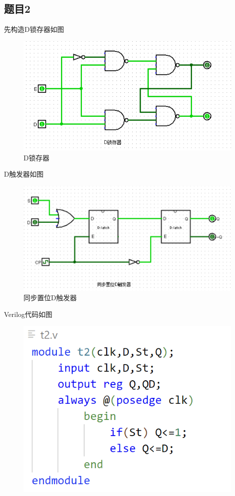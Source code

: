 \documentclass{article}
\begin{document}
    \clearpage
    \subsection*{题目2} 先构造D锁存器如图
    \begin{figure}[htbp]
        \centering
        \includegraphics[scale=0.65]{t21.png}
        \caption*{D锁存器}
    \end{figure}

    D触发器如图
    \begin{figure}[htbp]
        \centering
        \includegraphics[scale=0.65]{t22.png}
        \caption*{同步置位D触发器}
    \end{figure}

    Verilog代码如图
    \begin{figure}[htbp]
        \centering
        \includegraphics[scale=0.8]{t2v.png}
    \end{figure}
\end{document}
